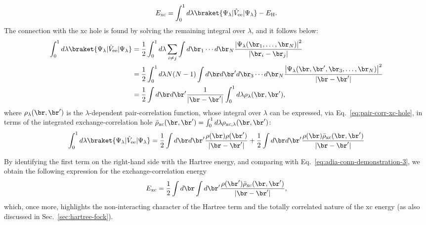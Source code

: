 %
\begin{equation}
    E_{\rm xc} = \int_0^1 d\lambda \braket{\Psi_{\lambda} | \hat{V}_{\rm ee} | \Psi_{\lambda}} - E_{\rm H} .
    \label{eq:adia-conn-demonstration-3}
\end{equation}
%
The connection with the xc hole is found by solving the remaining integral over $\lambda$, and it follows below:
%
\begin{equation}
    \begin{split}
    \int_0^1 d\lambda \braket{\Psi_{\lambda} | \hat{V}_{\rm ee} | \Psi_{\lambda}} &= \frac{1}{2} \int_0^1 d\lambda \sum_{i \neq j} \int d\br_1 \cdots d\br_N \frac{\left|\Psi_{\lambda}(\br_1, \dots, \br_N)\right|^2}{|\br_i - \br_j|} \\
    &= \frac{1}{2} \int_0^1 d\lambda N(N-1) \int d\br d\br' d\br_3 \cdots d\br_N \frac{\left|\Psi_{\lambda}(\br, \br', \br_3, \dots, \br_N)\right|^2}{|\br - \br'|} \\
    &= \frac{1}{2} \int d\br d\br' \frac{1}{|\br - \br'|} \int_0^1 d\lambda \rho_{\lambda}(\br,\br') ,
    \end{split}
    \label{eq:adia-conn-demonstration-4}
\end{equation}
%
where $\rho_{\lambda}(\br,\br')$ is the $\lambda$-dependent pair-correlation function, whose integral over $\lambda$ can be expressed, via Eq.~\eqref{eq:pair-corr-xc-hole}, in terms of the integrated exchange-correlation hole $\Bar{\rho}_{\rm xc}(\br,\br') = \int_0^1 d\lambda \rho_{\rm xc,\lambda}(\br,\br')$:
%
\begin{equation}
    \int_0^1 d\lambda \braket{\Psi_{\lambda} | \hat{V}_{\rm ee} | \Psi_{\lambda}} = \frac{1}{2} \int d\br d\br' \frac{\rho(\br) \rho(\br')}{|\br - \br'|} + \frac{1}{2} \int d\br d\br' \frac{\rho(\br) \Bar{\rho}_{\rm xc}(\br,\br')}{|\br - \br'|}
    \label{eq:adia-conn-demonstration-5}
\end{equation}

By identifying the first term on the right-hand side with the Hartree energy, and comparing with 
Eq.~\eqref{eq:adia-conn-demonstration-3}, we obtain the following expression for the exchange-correlation energy
%
\begin{equation}
    E_{\rm xc} = \frac{1}{2} \int d\br \int d\br' \frac{\rho(\br')\Bar{\rho}_{\rm xc}(\br,\br')}{|\br-\br'|} ,
    \label{eq:xc-ene-xc-hole}
\end{equation}
%
which, once more, highlights the non-interacting character of the Hartree term and the totally correlated nature of the xc energy (as also discussed in Sec.~\ref{sec:hartree-fock}).

